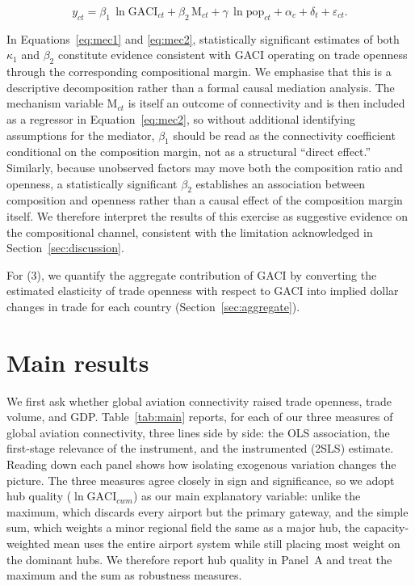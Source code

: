 \begin{equation}
y_{ct}
= \beta_1\,\ln\mathrm{GACI}_{ct}
+ \beta_2\,\mathrm{M}_{ct}
+ \gamma\,\ln\mathrm{pop}_{ct}
+ \alpha_c + \delta_t + \varepsilon_{ct}.
\label{eq:mec2}
\end{equation}

In Equations~\eqref{eq:mec1} and \eqref{eq:mec2}, statistically significant estimates of both $\kappa_1$ and $\beta_2$ constitute evidence consistent with GACI operating on trade openness through the corresponding compositional margin. We emphasise that this is a descriptive decomposition rather than a formal causal mediation analysis. The mechanism variable $\mathrm{M}_{ct}$ is itself an outcome of connectivity and is then included as a regressor in Equation~\eqref{eq:mec2}, so without additional identifying assumptions for the mediator, $\beta_1$ should be read as the connectivity coefficient conditional on the composition margin, not as a structural ``direct effect.'' Similarly, because unobserved factors may move both the composition ratio and openness, a statistically significant $\beta_2$ establishes an association between composition and openness rather than a causal effect of the composition margin itself. We therefore interpret the results of this exercise as suggestive evidence on the compositional channel, consistent with the limitation acknowledged in Section~\ref{sec:discussion}.

For (3), we quantify the aggregate contribution of GACI by converting the estimated elasticity of trade openness with respect to GACI into implied dollar changes in trade for each country (Section~\ref{sec:aggregate}).

\section{Main results}
\label{sec:results}

We first ask whether global aviation connectivity raised trade openness, trade
volume, and GDP. Table~\ref{tab:main} reports, for each of our three measures of
global aviation connectivity, three lines side by side: the OLS association, the
first-stage relevance of the instrument, and the instrumented (2SLS) estimate.
Reading down each panel shows how isolating exogenous variation changes the
picture. The three measures agree closely in sign and significance, so we adopt
hub quality ($\ln\mathrm{GACI}_{cwm}$) as our main explanatory variable: unlike
the maximum, which discards every airport but the primary gateway, and the simple
sum, which weights a minor regional field the same as a major hub, the
capacity-weighted mean uses the entire airport system while still placing most
weight on the dominant hubs. We therefore report hub quality in Panel~A and treat
the maximum and the sum as robustness measures.

